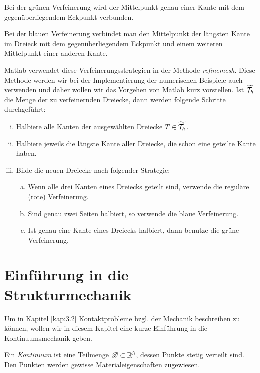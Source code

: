 Bei der grünen Verfeinerung wird der Mittelpunkt genau einer Kante mit dem gegenüberliegendem Eckpunkt verbunden.

Bei der blauen Verfeinerung verbindet man den Mittelpunkt der längsten Kante im Dreieck mit dem gegenüberliegendem Eckpunkt und einem weiteren Mittelpunkt einer anderen Kante.

Matlab verwendet diese Verfeinerungsstrategien in der Methode \textit{refinemesh}. Diese Methode werden wir bei der Implementierung der numerischen Beispiele auch verwenden und daher wollen wir das Vorgehen von Matlab kurz vorstellen. Ist $\widetilde{\mathcal T_h}$ die Menge der zu verfeinernden Dreiecke, dann werden folgende Schritte durchgeführt:
\begin{enumerate}[(i)]
\item Halbiere alle Kanten der ausgewählten Dreiecke $T \in \widetilde{\mathcal T_h}$.
\item Halbiere jeweils die längste Kante aller Dreiecke, die schon eine geteilte Kante haben. 
\item Bilde die neuen Dreiecke nach folgender Strategie:
\begin{enumerate}[(a)]
\item Wenn alle drei Kanten eines Dreiecks geteilt sind, verwende die reguläre (rote) Verfeinerung.
\item Sind genau zwei Seiten halbiert, so verwende die blaue Verfeinerung.
\item Ist genau eine Kante eines Dreiecks halbiert, dann benutze die grüne Verfeinerung.
\end{enumerate}
\end{enumerate}





\section{Einführung in die Strukturmechanik}
\label{kap:2.5}


Um in Kapitel \ref{kap:3.2} Kontaktprobleme bzgl. der Mechanik beschreiben zu können, wollen wir in diesem Kapitel eine kurze Einführung in die Kontinuumsmechanik geben.

\begin{defi}
Ein \textit{Kontinuum} ist eine Teilmenge $\mathscr{B}\subset \mathbb{R}^3$, dessen  Punkte stetig verteilt sind. Den Punkten werden gewisse Materialeigenschaften zugewiesen.
\end{defi}


